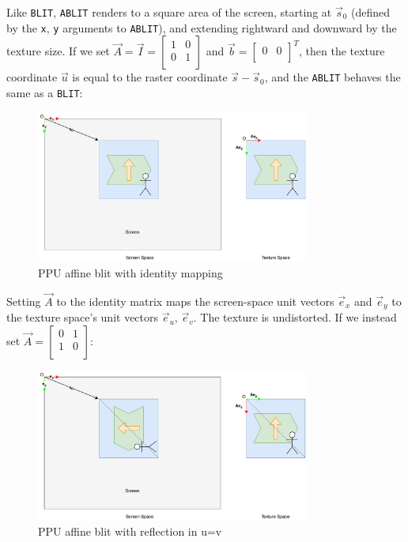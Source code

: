 Like {\tt BLIT}, {\tt ABLIT} renders to a square area of the screen, starting at $\vec{s}_0$ (defined by the {\tt x}, {\tt y} arguments to {\tt ABLIT}), and extending rightward and downward by the texture size.  If we set $\vec{A} = \vec{I} = \begin{bmatrix} 1 & 0 \\ 0 & 1 \\ \end{bmatrix}$ and $\vec{b} = \begin{bmatrix} 0 & 0 \\ \end{bmatrix}^T$, then the texture coordinate $\vec{u}$ is equal to the raster coordinate $\vec{s}-\vec{s}_0$, and the {\tt ABLIT} behaves the same as a {\tt BLIT}:

\begin{figure}[H]
\centering
\caption{PPU affine blit with identity mapping}
\label{diagram:ppu_texture_ablit01}
\includegraphics[width=0.8\textwidth]{diagrams/ppu_texture_ablit01.pdf}
\end{figure}

Setting $\vec{A}$ to the identity matrix maps the screen-space unit vectors $\vec{e}_x$ and $\vec{e}_y$ to the texture space's unit vectors $\vec{e}_u$, $\vec{e}_v$. The texture is undistorted. If we instead set $\vec{A} = \begin{bmatrix} 0 & 1 \\ 1 & 0 \\ \end{bmatrix}$:

\begin{figure}[H]
\centering
\caption{PPU affine blit with reflection in u=v}
\label{diagram:ppu_texture_ablit02}
\includegraphics[width=0.8\textwidth]{diagrams/ppu_texture_ablit02.pdf}
\end{figure}

